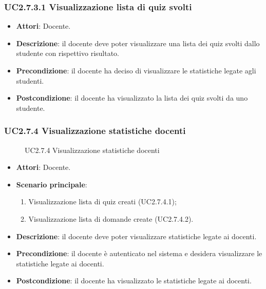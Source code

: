 \subsubsection{UC2.7.3.1 Visualizzazione lista di quiz svolti}
\begin{itemize}
\item \textbf{Attori}: Docente.
\item \textbf{Descrizione}: il docente deve poter visualizzare una lista dei quiz svolti dallo studente con rispettivo risultato.
\item \textbf{Precondizione}: il docente ha deciso di visualizzare le statistiche legate agli studenti.
\item \textbf{Postcondizione}: il docente ha visualizzato la lista dei quiz svolti da uno studente.
\end{itemize}
\subsubsection{UC2.7.4 Visualizzazione statistiche docenti}
\begin{figure}[H]
\centering
\noindent{}
\caption{UC2.7.4 Visualizzazione statistiche docenti}
\end{figure}
\begin{itemize}
\item \textbf{Attori}: Docente.
\item \textbf{Scenario principale}:
\begin{enumerate}
\item Visualizzazione lista di quiz creati (UC2.7.4.1);
\item Visualizzazione lista di domande create (UC2.7.4.2).
\end{enumerate}
\item \textbf{Descrizione}: il docente deve poter visualizzare statistiche legate ai docenti.
\item \textbf{Precondizione}: il docente è autenticato nel sistema e desidera visualizzare le statistiche legate ai docenti.
\item \textbf{Postcondizione}: il docente ha visualizzato le statistiche legate ai docenti.
\end{itemize}

